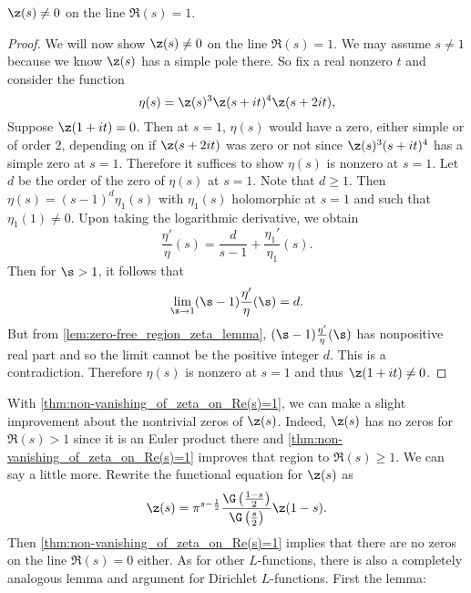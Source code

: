       \begin{theorem}\label{thm:non-vanishing_of_zeta_on_Re(s)=1}
        $\z(s) \neq 0$ on the line $\Re(s) = 1$.
      \end{theorem}
      \begin{proof}
        We will now show $\z(s) \neq 0$ on the line $\Re(s) = 1$. We may assume $s \neq 1$ because we know $\z(s)$ has a simple pole there. So fix a real nonzero $t$ and consider the function
        \[
          \eta(s) = \z(s)^{3}\z(s+it)^{4}\z(s+2it),
        \]
        Suppose $\z(1+it) = 0$. Then at $s = 1$, $\eta(s)$ would have a zero, either simple or of order $2$, depending on if $\z(s+2it)$ was zero or not since $\z(s)^{3}(s+it)^{4}$ has a simple zero at $s = 1$. Therefore it suffices to show $\eta(s)$ is nonzero at $s = 1$. Let $d$ be the order of the zero of $\eta(s)$ at $s = 1$. Note that $d \ge 1$. Then $\eta(s) = (s-1)^{d}\eta_{1}(s)$ with $\eta_{1}(s)$ holomorphic at $s = 1$ and such that $\eta_{1}(1) \neq 0$. Upon taking the logarithmic derivative, we obtain
        \[
          \frac{\eta'}{\eta}(s) = \frac{d}{s-1}+\frac{\eta_{1}'}{\eta_{1}}(s).
        \]
        Then for $\s > 1$, it follows that
        \[
          \lim_{\s \to 1}(\s-1)\frac{\eta'}{\eta}(\s) = d.
        \]
        But from \cref{lem:zero-free_region_zeta_lemma}, $(\s-1)\frac{\eta'}{\eta}(\s)$ has nonpositive real part and so the limit cannot be the positive integer $d$. This is a contradiction. Therefore $\eta(s)$ is nonzero at $s = 1$ and thus $\z(1+it) \neq 0$.
      \end{proof}

      With \cref{thm:non-vanishing_of_zeta_on_Re(s)=1}, we can make a slight improvement about the nontrivial zeros of $\z(s)$. Indeed, $\z(s)$ has no zeros for $\Re(s) > 1$ since it is an Euler product there and \cref{thm:non-vanishing_of_zeta_on_Re(s)=1} improves that region to $\Re(s) \ge 1$. We can say a little more. Rewrite the functional equation for $\z(s)$ as
      \[
        \z(s) = \pi^{s-\frac{1}{2}}\frac{\G\left(\frac{1-s}{2}\right)}{\G\left(\frac{s}{2}\right)}\z(1-s).
      \]
      Then \cref{thm:non-vanishing_of_zeta_on_Re(s)=1} implies that there are no zeros on the line $\Re(s) = 0$ either. As for other $L$-functions, there is also a completely analogous lemma and argument for Dirichlet $L$-functions. First the lemma:

